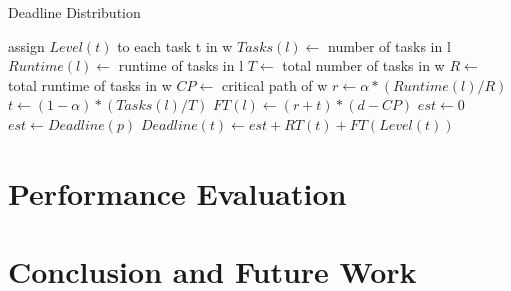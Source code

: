 \documentclass{sig-alternate}
\begin{document}
\begin{algorithm}
\caption{Deadline Distribution}
\label{alg:deadlinedistribution}
\begin{algorithmic}[1]
    \State assign $Level(t)$ to each task t in w
        \State $Tasks(l) \gets$ number of tasks in l
        \State $Runtime(l) \gets$ runtime of tasks in l
    \EndFor
    \State $T \gets$ total number of tasks in w
    \State $R \gets$ total runtime of tasks in w
    \State $CP \gets$ critical path of w
        \State $r \gets \alpha * (Runtime(l)/R)$
        \State $t \gets (1-\alpha) * (Tasks(l)/T)$
        \State $FT(l) \gets (r + t) * (d - CP)$
    \EndFor
        \State $est \gets 0$
            \State $est \gets Deadline(p)$
        \EndFor
        \State $Deadline(t) \gets est + RT(t) + FT(Level(t))$
    \EndFor
\EndProcedure
\end{algorithmic} 
\end{algorithm}

\section{Performance Evaluation}


\section{Conclusion and Future Work}







\end{document}
